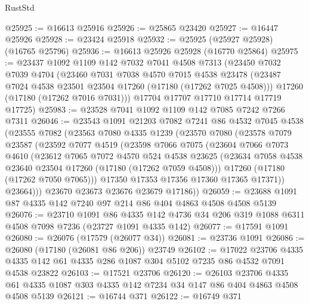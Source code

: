 \begin{lexlean}{RustStd}
\begin{coremodule}
{\begin{coremodule}
{{{{{{{{{{{{{{{{{{{{{{{{{{{{{{{{{{{{{{{{{{{{{{{{{{{{{{{@25925 := @16613 @25916
@25926 := @25865 @23420
@25927 := @16447 @25926
@25928 := @23424 @25918
@25932 := @25925 (@25927 @25928) (@16765 @25796)
@25936 := @16613 @25926 @25928 (@16770 @25864)
@25975 := @23437
    @1092
    @1109
    @142
    @7032
    @7041
    @4508
    @7313
    (@23450
      @7032
      @7039
      @4704
      (@23460
        @7031
        @7038
        @4570
        @7015
        @4538
        @23478
        (@23487 @7024 @4538 @23501 @23504 @17260 (@17180 (@17262 @7025 @4508)))
        @17260
        (@17180 (@17262 @7016 @7031)))
      @17704
      @17707
      @17710
      @17714
      @17719
      @17725)
@25983 := @23528 @7041 @1092 @1109 @142 @7085 @7242 @7266 @7311
@26046 := @23543
    @1091
    @21203
    @7082
    @7241
    @86
    @4532
    @7045
    @4538
    (@23555
      @7082
      (@23563
        @7080
        @4335
        @1239
        (@23570
          @7080
          (@23578
            @7079
            @23587
            (@23592
              @7077
              @4519
              (@23598
                @7066
                @7075
                (@23604
                  @7066
                  @7073
                  @4610
                  (@23612
                    @7065
                    @7072
                    @4570
                    @524
                    @4538
                    @23625
                    (@23634 @7058 @4538 @23640 @23504 @17260 (@17180 (@17262 @7059 @4508)))
                    @17260
                    (@17180 (@17262 @7050 @7065)))
                  @17350
                  @17353
                  @17356
                  @17360
                  @17365
                  @17371))
              @23664)))
        @23670
        @23673
        @23676
        @23679
        @17186))
@26059 := @23688 @1091 @87 @4335 @142 @7240 @97 @214 @86 @404 @4863 @4508 @4508 @5139
@26076 := @23710
    @1091
    @86
    @4335
    @142
    @4736
    @34
    @206
    @319
    @1088
    @6311
    @4508
    @7098
    @7236
    (@23727 @1091 @4335 @142)
@26077 := @17591 @1091
@26080 := @26076 (@17579 (@26077 @34))
@26081 := @23736 @1091
@26086 := @26080 (@17180 (@26081 @86 @206)) @23749
@26102 := @17022
    @23706
    @4335
    @4335
    @142
    @61
    @4335
    @286
    @1087
    @304
    @5102
    @7235
    @86
    @4532
    @7091
    @4538
    @23822
@26103 := @17521 @23706
@26120 := @26103
    @23706
    @4335
    @61
    @4335
    @1087
    @303
    @4335
    @142
    @7234
    @34
    @147
    @86
    @404
    @4863
    @4508
    @4508
    @5139
@26121 := @16744 @371
@26122 := @16749 @371
}}}}}}}}}}}}}}}}}}}}}}}}}}}}}}}}}}}}}}}}}}}}}}}}}}}}}}}
\end{coremodule}}
\end{coremodule}
\end{lexlean}
